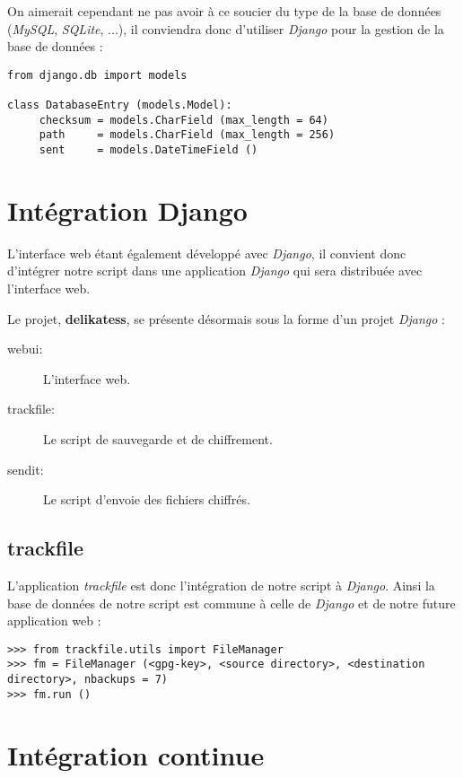 On aimerait cependant ne pas avoir à ce soucier du type de la base de données (\textit{MySQL}, \textit{SQLite},
...), il conviendra donc d'utiliser \textit{Django} pour la gestion de la base de données :

\begin{verbatim}
from django.db import models

class DatabaseEntry (models.Model):
     checksum = models.CharField (max_length = 64)
     path     = models.CharField (max_length = 256)
     sent     = models.DateTimeField ()
\end{verbatim}

\section{Intégration Django}

L'interface web étant également développé avec \textit{Django}, il convient donc d'intégrer notre script
dans une application \textit{Django} qui sera distribuée avec l'interface web.

Le projet, \textbf{delikatess}, se présente désormais sous la forme d'un projet \textit{Django} :

\begin{description}
     \item[webui:] L'interface web.
     \item[trackfile:] Le script de sauvegarde et de chiffrement.
     \item[sendit:] Le script d'envoie des fichiers chiffrés.
\end{description}

\subsection{trackfile}

L'application \textit{trackfile} est donc l'intégration de notre script à \textit{Django}.
Ainsi la base de données de notre script est commune à celle de \textit{Django} et de notre
future application web :

\begin{verbatim}
>>> from trackfile.utils import FileManager
>>> fm = FileManager (<gpg-key>, <source directory>, <destination directory>, nbackups = 7)
>>> fm.run ()
\end{verbatim}

\section{Intégration continue}

